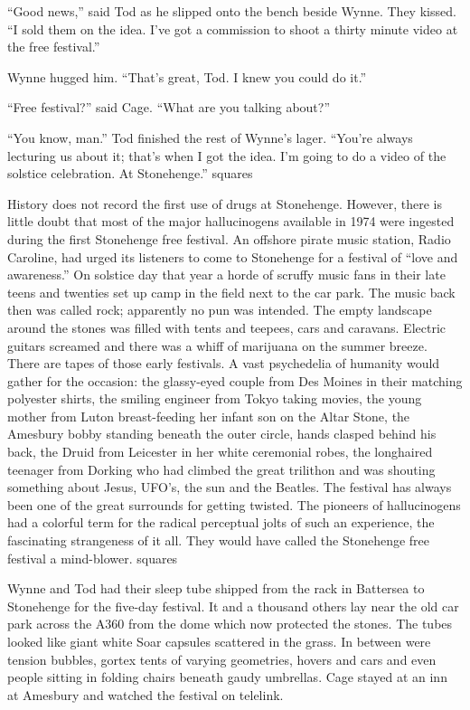 “Good news,” said Tod as he slipped onto the bench beside Wynne. They kissed. “I sold them on the idea. I’ve got a commission to shoot a thirty minute video at the free festival.”

Wynne hugged him. “That’s great, Tod. I knew you could do it.”

“Free festival?” said Cage. “What are you talking about?”

“You know, man.” Tod finished the rest of Wynne’s lager. “You’re always lecturing us about it; that’s when I got the idea. I’m going to do a video of the solstice celebration. At Stonehenge.”
squares

History does not record the first use of drugs at Stonehenge. However, there is little doubt that most of the major hallucinogens available in 1974 were ingested during the first Stonehenge free festival. An offshore pirate music station, Radio Caroline, had urged its listeners to come to Stonehenge for a festival of “love and awareness.” On solstice day that year a horde of scruffy music fans in their late teens and twenties set up camp in the field next to the car park. The music back then was called rock; apparently no pun was intended. The empty landscape around the stones was filled with tents and teepees, cars and caravans. Electric guitars screamed and there was a whiff of marijuana on the summer breeze. There are tapes of those early festivals. A vast psychedelia of humanity would gather for the occasion: the glassy-eyed couple from Des Moines in their matching polyester shirts, the smiling engineer from Tokyo taking movies, the young mother from Luton breast-feeding her infant son on the Altar Stone, the Amesbury bobby standing beneath the outer circle, hands clasped behind his back, the Druid from Leicester in her white ceremonial robes, the longhaired teenager from Dorking who had climbed the great trilithon and was shouting something about Jesus, UFO’s, the sun and the Beatles. The festival has always been one of the great surrounds for getting twisted. The pioneers of hallucinogens had a colorful term for the radical perceptual jolts of such an experience, the fascinating strangeness of it all. They would have called the Stonehenge free festival a mind-blower.
squares

Wynne and Tod had their sleep tube shipped from the rack in Battersea to Stonehenge for the five-day festival. It and a thousand others lay near the old car park across the A360 from the dome which now protected the stones. The tubes looked like giant white Soar capsules scattered in the grass. In between were tension bubbles, gortex tents of varying geometries, hovers and cars and even people sitting in folding chairs beneath gaudy umbrellas. Cage stayed at an inn at Amesbury and watched the festival on telelink.

